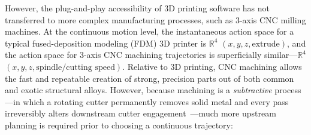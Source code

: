 \documentclass[conference]{IEEEtran}
\begin{document}
However, the plug-and-play accessibility of 3D printing software has not transferred to more complex manufacturing processes, such as 3-axis CNC milling machines. At the continuous motion level, the instantaneous action space for a typical fused-deposition modeling (FDM) 3D printer is $\mathbb{R}^4$ $(x, y, z, \text{extrude})$, and the action space for 3-axis CNC machining trajectories is superficially similar—$\mathbb{R}^4$ $(x, y, z, \text{spindle/cutting speed})$. Relative to 3D printing, CNC machining allows the fast and repeatable creation of strong, precision parts out of both common and exotic structural alloys. However, because machining is a \emph{subtractive} process—in which a rotating cutter permanently removes solid metal and every pass irreversibly alters downstream cutter engagement~\cite{altintas2012manufacturing,suh2008cnc}—much more upstream planning is required prior to choosing a continuous trajectory:
\end{document}
